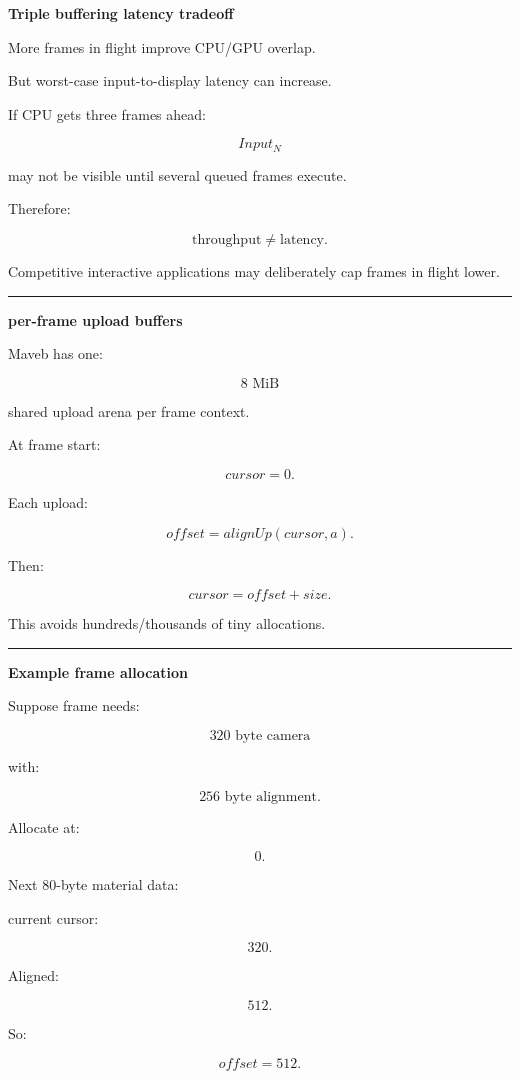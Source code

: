 \textbf{Triple buffering latency tradeoff}

More frames in flight improve CPU/GPU overlap.

But worst-case input-to-display latency can increase.

If CPU gets three frames ahead:

\[
Input_N
\]

may not be visible until several queued frames execute.

Therefore:

\[
\boxed{
\text{throughput}
\neq
\text{latency}.
}
\]

Competitive interactive applications may deliberately cap frames in flight lower.

\begin{center}\rule{0.5\linewidth}{0.5pt}\end{center}

\textbf{per-frame upload buffers}

Maveb has one:

\[
8\text{ MiB}
\]

shared upload arena per frame context.

At frame start:

\[
cursor=0.
\]

Each upload:

\[
offset=
alignUp(cursor,a).
\]

Then:

\[
cursor=
offset+size.
\]

This avoids hundreds/thousands of tiny allocations.

\begin{center}\rule{0.5\linewidth}{0.5pt}\end{center}

\textbf{Example frame allocation}

Suppose frame needs:

\[
320\text{ byte camera}
\]

with:

\[
256\text{ byte alignment}.
\]

Allocate at:

\[
0.
\]

Next 80-byte material data:

current cursor:

\[
320.
\]

Aligned:

\[
512.
\]

So:

\[
offset=512.
\]

